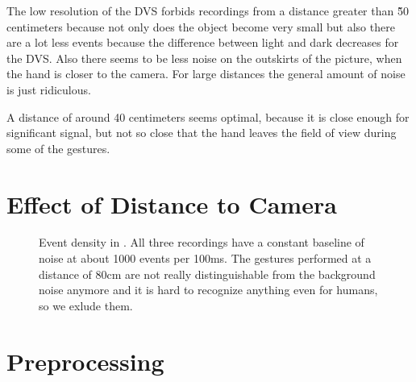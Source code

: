 The low resolution of the DVS forbids recordings from a distance greater than \~ 50 centimeters because not only does the object become very small but also there are a lot less events because the difference between light and dark decreases for the DVS.
Also there seems to be less noise on the outskirts of the picture, when the hand is closer to the camera.
For large distances the general amount of noise is just ridiculous.

A distance of around 40 centimeters seems optimal, because it is close enough for significant signal, but not so close that the hand leaves the field of view during some of the gestures.

\section{Effect of Distance to Camera}
\label{sec:distances}

\begin{figure}
  \centering
  \caption{Event density in . All three recordings have a constant
    baseline of noise at about 1000 events per 100ms. The gestures performed at a
    distance of 80cm are not really distinguishable from the background noise
    anymore and it is hard to recognize anything even for humans, so we exlude them.}
\end{figure}

\section{Preprocessing}
\label{sec:preprocessing}
